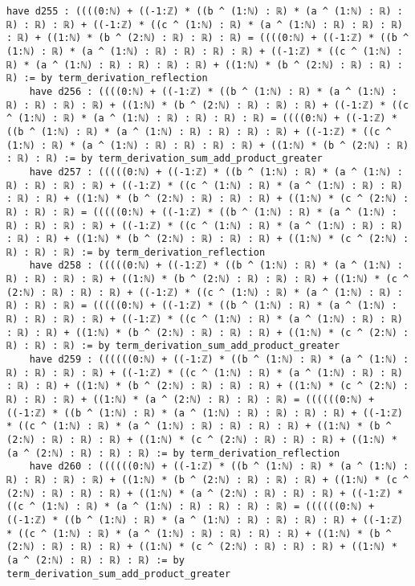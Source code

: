 \documentclass{article}
\begin{document}
\begin{tcolorbox}[colback=white!10, width=\linewidth]
\begin{lstlisting}[language=Lean4]
    have d255 : ((((0:ℕ) + ((-1:ℤ) * ((b ^ (1:ℕ) : ℝ) * (a ^ (1:ℕ) : ℝ) : ℝ) : ℝ) : ℝ) + ((-1:ℤ) * ((c ^ (1:ℕ) : ℝ) * (a ^ (1:ℕ) : ℝ) : ℝ) : ℝ) : ℝ) + ((1:ℕ) * (b ^ (2:ℕ) : ℝ) : ℝ) : ℝ) = ((((0:ℕ) + ((-1:ℤ) * ((b ^ (1:ℕ) : ℝ) * (a ^ (1:ℕ) : ℝ) : ℝ) : ℝ) : ℝ) + ((-1:ℤ) * ((c ^ (1:ℕ) : ℝ) * (a ^ (1:ℕ) : ℝ) : ℝ) : ℝ) : ℝ) + ((1:ℕ) * (b ^ (2:ℕ) : ℝ) : ℝ) : ℝ) := by term_derivation_reflection
    have d256 : ((((0:ℕ) + ((-1:ℤ) * ((b ^ (1:ℕ) : ℝ) * (a ^ (1:ℕ) : ℝ) : ℝ) : ℝ) : ℝ) + ((1:ℕ) * (b ^ (2:ℕ) : ℝ) : ℝ) : ℝ) + ((-1:ℤ) * ((c ^ (1:ℕ) : ℝ) * (a ^ (1:ℕ) : ℝ) : ℝ) : ℝ) : ℝ) = ((((0:ℕ) + ((-1:ℤ) * ((b ^ (1:ℕ) : ℝ) * (a ^ (1:ℕ) : ℝ) : ℝ) : ℝ) : ℝ) + ((-1:ℤ) * ((c ^ (1:ℕ) : ℝ) * (a ^ (1:ℕ) : ℝ) : ℝ) : ℝ) : ℝ) + ((1:ℕ) * (b ^ (2:ℕ) : ℝ) : ℝ) : ℝ) := by term_derivation_sum_add_product_greater
    have d257 : (((((0:ℕ) + ((-1:ℤ) * ((b ^ (1:ℕ) : ℝ) * (a ^ (1:ℕ) : ℝ) : ℝ) : ℝ) : ℝ) + ((-1:ℤ) * ((c ^ (1:ℕ) : ℝ) * (a ^ (1:ℕ) : ℝ) : ℝ) : ℝ) : ℝ) + ((1:ℕ) * (b ^ (2:ℕ) : ℝ) : ℝ) : ℝ) + ((1:ℕ) * (c ^ (2:ℕ) : ℝ) : ℝ) : ℝ) = (((((0:ℕ) + ((-1:ℤ) * ((b ^ (1:ℕ) : ℝ) * (a ^ (1:ℕ) : ℝ) : ℝ) : ℝ) : ℝ) + ((-1:ℤ) * ((c ^ (1:ℕ) : ℝ) * (a ^ (1:ℕ) : ℝ) : ℝ) : ℝ) : ℝ) + ((1:ℕ) * (b ^ (2:ℕ) : ℝ) : ℝ) : ℝ) + ((1:ℕ) * (c ^ (2:ℕ) : ℝ) : ℝ) : ℝ) := by term_derivation_reflection
    have d258 : (((((0:ℕ) + ((-1:ℤ) * ((b ^ (1:ℕ) : ℝ) * (a ^ (1:ℕ) : ℝ) : ℝ) : ℝ) : ℝ) + ((1:ℕ) * (b ^ (2:ℕ) : ℝ) : ℝ) : ℝ) + ((1:ℕ) * (c ^ (2:ℕ) : ℝ) : ℝ) : ℝ) + ((-1:ℤ) * ((c ^ (1:ℕ) : ℝ) * (a ^ (1:ℕ) : ℝ) : ℝ) : ℝ) : ℝ) = (((((0:ℕ) + ((-1:ℤ) * ((b ^ (1:ℕ) : ℝ) * (a ^ (1:ℕ) : ℝ) : ℝ) : ℝ) : ℝ) + ((-1:ℤ) * ((c ^ (1:ℕ) : ℝ) * (a ^ (1:ℕ) : ℝ) : ℝ) : ℝ) : ℝ) + ((1:ℕ) * (b ^ (2:ℕ) : ℝ) : ℝ) : ℝ) + ((1:ℕ) * (c ^ (2:ℕ) : ℝ) : ℝ) : ℝ) := by term_derivation_sum_add_product_greater
    have d259 : ((((((0:ℕ) + ((-1:ℤ) * ((b ^ (1:ℕ) : ℝ) * (a ^ (1:ℕ) : ℝ) : ℝ) : ℝ) : ℝ) + ((-1:ℤ) * ((c ^ (1:ℕ) : ℝ) * (a ^ (1:ℕ) : ℝ) : ℝ) : ℝ) : ℝ) + ((1:ℕ) * (b ^ (2:ℕ) : ℝ) : ℝ) : ℝ) + ((1:ℕ) * (c ^ (2:ℕ) : ℝ) : ℝ) : ℝ) + ((1:ℕ) * (a ^ (2:ℕ) : ℝ) : ℝ) : ℝ) = ((((((0:ℕ) + ((-1:ℤ) * ((b ^ (1:ℕ) : ℝ) * (a ^ (1:ℕ) : ℝ) : ℝ) : ℝ) : ℝ) + ((-1:ℤ) * ((c ^ (1:ℕ) : ℝ) * (a ^ (1:ℕ) : ℝ) : ℝ) : ℝ) : ℝ) + ((1:ℕ) * (b ^ (2:ℕ) : ℝ) : ℝ) : ℝ) + ((1:ℕ) * (c ^ (2:ℕ) : ℝ) : ℝ) : ℝ) + ((1:ℕ) * (a ^ (2:ℕ) : ℝ) : ℝ) : ℝ) := by term_derivation_reflection
    have d260 : ((((((0:ℕ) + ((-1:ℤ) * ((b ^ (1:ℕ) : ℝ) * (a ^ (1:ℕ) : ℝ) : ℝ) : ℝ) : ℝ) + ((1:ℕ) * (b ^ (2:ℕ) : ℝ) : ℝ) : ℝ) + ((1:ℕ) * (c ^ (2:ℕ) : ℝ) : ℝ) : ℝ) + ((1:ℕ) * (a ^ (2:ℕ) : ℝ) : ℝ) : ℝ) + ((-1:ℤ) * ((c ^ (1:ℕ) : ℝ) * (a ^ (1:ℕ) : ℝ) : ℝ) : ℝ) : ℝ) = ((((((0:ℕ) + ((-1:ℤ) * ((b ^ (1:ℕ) : ℝ) * (a ^ (1:ℕ) : ℝ) : ℝ) : ℝ) : ℝ) + ((-1:ℤ) * ((c ^ (1:ℕ) : ℝ) * (a ^ (1:ℕ) : ℝ) : ℝ) : ℝ) : ℝ) + ((1:ℕ) * (b ^ (2:ℕ) : ℝ) : ℝ) : ℝ) + ((1:ℕ) * (c ^ (2:ℕ) : ℝ) : ℝ) : ℝ) + ((1:ℕ) * (a ^ (2:ℕ) : ℝ) : ℝ) : ℝ) := by term_derivation_sum_add_product_greater

\end{lstlisting}
\end{tcolorbox}
\end{document}
